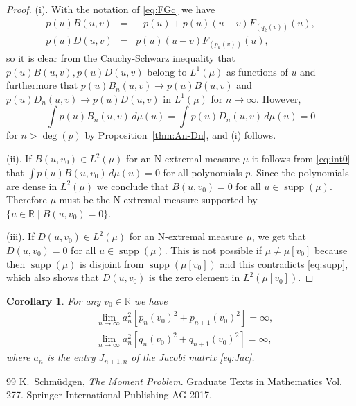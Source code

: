 \documentclass[10pt,a4paper]{amsart}
\newtheorem{cor}[thm]{Corollary}
\DeclareMathOperator{\supp}{supp}
\newcommand{\R}{\mathbb{R}}
\begin{document}
\setcounter{section}{3}
\setcounter{equation}{0}
\setcounter{thm}{1}
\begin{proof} (i). With the notation of \eqref{eq:FGc} we have
\begin{eqnarray*}
p(u)B(u,v)&=&-p(u)+p(u)(u-v)F_{(q_k(v))}(u),\\
 p(u)D(u,v)&=&p(u)(u-v)F_{(p_k(v))}(u),
\end{eqnarray*}
so it is clear from the Cauchy-Schwarz inequality that $p(u)B(u,v), p(u)D(u,v)$ belong to $L^1(\mu)$ as functions of $u$ and furthermore that
$p(u)B_n(u,v)\to p(u)B(u,v)$ and $p(u)D_n(u,v)\to p(u)D(u,v)$  in $L^1(\mu)$ for $n\to\infty$. However,
\begin{equation}\label{eq:int0}
\int p(u)B_n(u,v)\,d\mu(u)=\int p(u)D_n(u,v)\,d\mu(u)=0
\end{equation}
 for $n>\deg(p)$ by Proposition~\ref{thm:An-Dn}, and (i) follows.

(ii). If $B(u,v_0)\in L^2(\mu)$ for an N-extremal measure $\mu$ it follows from \eqref{eq:int0} that $\int p(u)B(u,v_0)\,d\mu(u)=0$ for all polynomials $p$. Since the polynomials are dense in $L^2(\mu)$ we conclude that $B(u,v_0)=0$ for all $u\in\supp(\mu)$. Therefore $\mu$ must be the N-extremal measure supported by $\{u\in\R \mid B(u,v_0)=0\}$.

(iii). If $D(u,v_0)\in L^2(\mu)$ for an N-extremal measure $\mu$, we get that $D(u,v_0)=0$ for all $u\in\supp(\mu)$. This is not possible if $\mu\neq \mu[v_0]$ because then  
$\supp(\mu)$ is disjoint from $\supp(\mu[v_0])$ and this contradicts \eqref{eq:supp}, which also shows that  $D(u,v_0)$ is the zero element in $L^2(\mu[v_0])$.
\end{proof}

\setcounter{section}{3}
\setcounter{equation}{1}
\setcounter{thm}{1}
\begin{cor}\label{thm:limit} For any $v_0\in\R$ we have
\begin{eqnarray*}
&\lim_{n\to\infty} a_n^2[p_n(v_0)^2+p_{n+1}(v_0)^2]=\infty,\\
&\lim_{n\to\infty} a_n^2[q_n(v_0)^2+q_{n+1}(v_0)^2]=\infty,
\end{eqnarray*}
where $a_n$ is the entry $J_{n+1,n}$  of the Jacobi matrix \eqref{eq:Jac}.
\end{cor}

\begin{thebibliography}{99}
 K.~Schm\"{u}dgen, {\it The Moment Problem}. Graduate Texts in Mathematics Vol. 277. Springer International Publishing AG 2017. 
\end{thebibliography}
\end{document}
